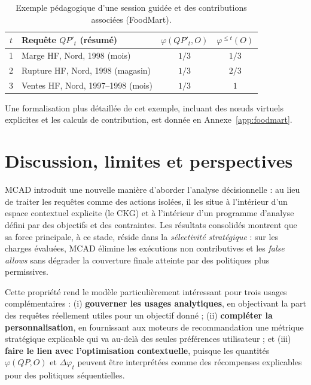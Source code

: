 \documentclass[journal]{IEEEtran}
\begin{document}
\begin{table}[!t]
\centering
\caption{Exemple pédagogique d'une session guidée et des contributions associées (FoodMart).}
\begin{tabular}{@{}clcc@{}}
\toprule
$t$ & Requête $QP'_t$ (résumé) & $\varphi(QP'_t,O)$ & $\varphi^{\le t}(O)$ \\
\midrule
1 & Marge HF, Nord, 1998 (mois) & $1/3$ & $1/3$ \\
2 & Rupture HF, Nord, 1998 (magasin) & $1/3$ & $2/3$ \\
3 & Ventes HF, Nord, 1997--1998 (mois) & $1/3$ & $1$ \\
\bottomrule
\end{tabular}
\label{tab:guided-session}
\end{table}

Une formalisation plus détaillée de cet exemple, incluant des nœuds virtuels explicites et les calculs de contribution, est donnée en Annexe~\ref{app:foodmart}.




\section{Discussion, limites et perspectives}
\label{sec:disc}

MCAD introduit une nouvelle manière d'aborder l'analyse décisionnelle : au lieu de traiter les requêtes comme des actions isolées, il les situe à l'intérieur d'un espace contextuel explicite (le CKG) et à l'intérieur d'un programme d'analyse défini par des objectifs et des contraintes. Les résultats consolidés montrent que sa force principale, à ce stade, réside dans la \emph{sélectivité stratégique} : sur les charges évaluées, MCAD élimine les exécutions non contributives et les \emph{false allows} sans dégrader la couverture finale atteinte par des politiques plus permissives.

Cette propriété rend le modèle particulièrement intéressant pour trois usages complémentaires : (i) \textbf{gouverner les usages analytiques}, en objectivant la part des requêtes réellement utiles pour un objectif donné ; (ii) \textbf{compléter la personnalisation}, en fournissant aux moteurs de recommandation une métrique stratégique explicable qui va au-delà des seules préférences utilisateur ; et (iii) \textbf{faire le lien avec l'optimisation contextuelle}, puisque les quantités $\varphi(QP,O)$ et $\Delta\varphi_t$ peuvent être interprétées comme des récompenses explicables pour des politiques séquentielles.
\end{document}
